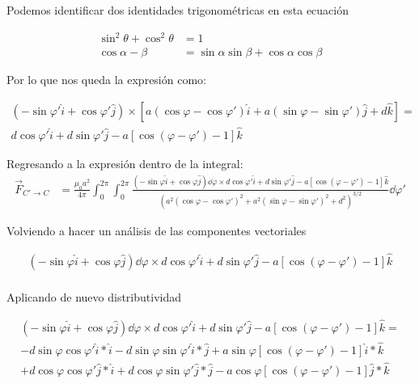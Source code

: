 \documentclass[11pt]{report}
\theoremstyle{plain}
\theoremstyle{definition}
\begin{document}
	Podemos identificar dos identidades trigonométricas en esta ecuación
	
	\begin{align*}%
		\sin^2{\theta} + \cos^2{\theta} &= 1\\
		\cos{\alpha - \beta} &= \sin{\alpha }\sin{\beta}+\cos{\alpha }\cos{\beta}
	\end{align*}
	
	Por lo que nos queda la expresión como:
	
	\begin{align*} %
		\left(-\sin\varphi'\hat{i} + \cos\varphi'\hat{j}\right) \times \left[a(\cos\varphi-\cos\varphi')\hat{i} + a(\sin\varphi-\sin\varphi')\hat{j} + d\hat{k} \right] =\\
		d\cos\varphi'\hat{i}+d\sin\varphi'\hat{j}-a\left[\cos{(\varphi-\varphi')}-1\right]\hat{k}
	\end{align*}
	
	Regresando a la expresión dentro de la integral:
	\begin{align*}%
		\vec{F}_{C'\rightarrow C}&= \frac{\mu_0a^2}{4\pi}\int_0^{2\pi}\int_0^{2\pi}\frac{\left(-\sin\varphi\hat{i} + \cos\varphi\hat{j}\right)\dd{\varphi} \times d\cos\varphi'\hat{i}+d\sin\varphi'\hat{j}-a\left[\cos{(\varphi-\varphi')}-1\right]\hat{k}}{\left(a^2(\cos\varphi-\cos\varphi')^2 + a^2(\sin\varphi-\sin\varphi')^2 + d^2\right)^{3/2}}\dd{\varphi'}
	\end{align*}
	
	Volviendo a hacer un análisis de las componentes vectoriales
	
	\begin{align*}%
		\left(-\sin\varphi\hat{i} + \cos\varphi\hat{j}\right)\dd{\varphi} \times d\cos\varphi'\hat{i}+d\sin\varphi'\hat{j}-a\left[\cos{(\varphi-\varphi')}-1\right]\hat{k}\\
	\end{align*}
	
	Aplicando de nuevo distributividad
	
	\begin{align*}%
		\left(-\sin\varphi\hat{i} + \cos\varphi\hat{j}\right)\dd{\varphi} \times d\cos\varphi'\hat{i}+d\sin\varphi'\hat{j}-a\left[\cos{(\varphi-\varphi')}-1\right]\hat{k} = \\
		-d\sin\varphi \cos\varphi'\hat{i} * \hat{i} -d\sin\varphi\sin\varphi'\hat{i}*\hat{j}+ a\sin\varphi\left[\cos{(\varphi-\varphi')}-1\right]\hat{i}*\hat{k}\\
		+d\cos\varphi\cos\varphi'\hat{j}*\hat{i} + d\cos\varphi\sin\varphi'\hat{j}*\hat{j} - a\cos\varphi\left[\cos{(\varphi-\varphi')}-1\right]\hat{j}*\hat{k}
	\end{align*}

\end{document}

